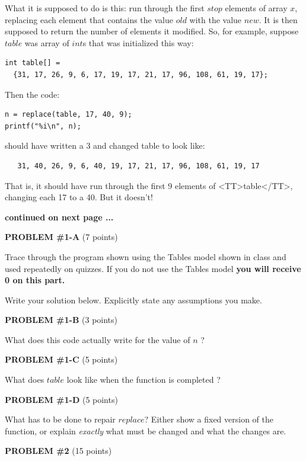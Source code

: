 What it is supposed to do is this: run through the
first $stop$ elements of array $x$, replacing each element that
contains the value $old$ with the value $new$.  It is then supposed to
return the number of elements it modified.  So, for example, suppose 
$table$ was array of $int$s that was initialized
this way:
\begin{verbatim}
int table[] =
  {31, 17, 26, 9, 6, 17, 19, 17, 21, 17, 96, 108, 61, 19, 17};
\end{verbatim}
Then the code:
\begin{verbatim}
n = replace(table, 17, 40, 9);
printf("%i\n", n);
\end{verbatim}
should have written a 3 and changed table to look like:
\begin{verbatim}
   31, 40, 26, 9, 6, 40, 19, 17, 21, 17, 96, 108, 61, 19, 17
\end{verbatim}
That is, it should have run through the first 9 elements of <TT>table</TT>,
changing each 17 to a 40.  But it doesn't!  

{\bf continued on next page ...}

\pagebreak
{\bf PROBLEM \#1-A} (7 points)

Trace through the program shown using the Tables model shown in class
and used repeatedly on quizzes.  If you do not use the Tables model
{\bf you will receive 0 on this part.}

Write your solution below.  Explicitly state any assumptions you make.

\pagebreak
{\bf PROBLEM \#1-B} (3 points)

What does this code actually write for the value of $n$ ?
\vspace{1.0in}

{\bf PROBLEM \#1-C} (5 points)

What does $table$ look like when the function is completed ?
\vspace{2.0in}

{\bf PROBLEM \#1-D} (5 points)

What has to be done to repair $replace$?  Either show a fixed version
of  the function, or explain {\em exactly} what must be changed and 
what the changes are.

\vspace{4.0in}

\pagebreak
{\bf PROBLEM \#2} (15 points)

